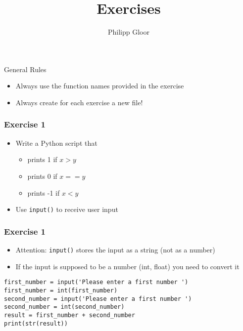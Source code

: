\documentclass[10pt, a4paper]{beamer} %
\title %
{Exercises}
\author %
{Philipp Gloor\inst{1}}
\institute
{
  \inst{1}%
  University of Zurich
}
\date{}
\begin{document}
\begin{frame}
	\titlepage
\end{frame}

\begin{frame}{General Rules}
	\begin{itemize}
		\item Always use the function names provided in the exercise
		\item Always create for each exercise a new file!
	\end{itemize}

\end{frame}

{
\bfseries
\begin{frame}\frametitle{Exercise 1}

	\begin{itemize}
		\item Write a Python script that
		      \begin{itemize}
			      \item prints 1 if $x > y$
			      \item prints 0 if $x == y$
			      \item prints -1 if $x < y$
		      \end{itemize}
		\item Use \texttt{input()} to receive user input
	\end{itemize}

\end{frame}
\begin{frame}\frametitle{Exercise 1}

	\begin{itemize}
		\item Attention: \texttt{input()} stores the input as a string (not as a number)
		\item If the input is supposed to be a number (int, float) you need to convert it
	\end{itemize}

	{
	\mdseries
	\begin{lstlisting}
first_number = input('Please enter a first number ')
first_number = int(first_number)
second_number = input('Please enter a first number ')
second_number = int(second_number)
result = first_number + second_number
print(str(result))
\end{lstlisting}
	}


\end{frame}}
\end{document}
